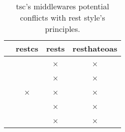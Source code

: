 
\begin{savenotes} %
  \begin{table}[htbp]
    \caption{\ac{tsc}'s middlewares potential conflicts with \ac{rest} style's principles.}
    \centering
    \begin{tabular}{lccc}
	&
	\ac{restcs} &
	\ac{rests} &
	\ac{resthateoas} \\
	\hline
	\midtsc{} & & × & × \\
	\midsws{} & & × & × \\
	\midtscpp{} & × & × & × \\
	\midtripcom{} & & × & × \\
	\midsmartmt{} & & × & × \\
	\hline
    \end{tabular}
    \label{tab:rest_principles}
  \end{table}
\end{savenotes}